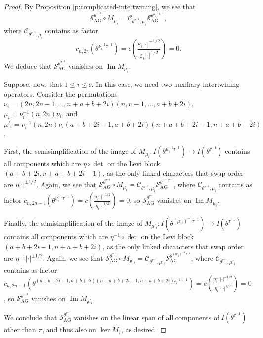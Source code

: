 \documentclass{amsart}
\theoremstyle{definition}
\renewcommand{\Im}{\operatorname{Im}}
\newcommand{\AG}{\operatorname{AG}}
\begin{document}
{\begin{proof}
By Proposition \ref{p:complicated-intertwining}, we see that
\[\mathcal{S}_{\AG}^{\theta^{\tau^{-1}}}\circ
M_{\mu_i}=\mathcal{C}_{\theta^{\tau^{-1}},\mu_i}\mathcal{S}_{\AG}^{\theta^{\mu_i^{-1}\tau^{-1}}},\]
where
$\mathcal{C}_{\theta^{\tau^{-1}},\mu_i}$ contains as factor
\[c_{n,2n}(\theta^{\nu_i^{-1}\tau^{-1}})=c\left(\frac{\varepsilon_i|\cdot|^{-1/2}}{\varepsilon_i|\cdot|^{1/2}}\right)=0.\]
We deduce that $\mathcal{S}_{\AG}^{\theta^{\tau^{-1}}}$ vanishes on $\Im M_{\mu_i}$.

Suppose, now, that $1\leqslant i\leqslant c$. In this case, we need two
auxiliary intertwining operators. Consider the permutations
$\nu_i=(2n,2n-1,\ldots, n+a+b+2i)(n,n-1,\ldots,a+b+2i)$,
$\mu_i=\nu_i^{-1}(n,2n)\nu_i$, and
$\mu'_i=\nu_i^{-1}(n,2n)\nu_i(a+b+2i-1,a+b+2i)(n+a+b+2i-1,n+a+b+2i)$.

First, the semisimplification of the image of
$M_{\mu_i}: I(\theta^{\mu_i^{-1}\tau^{-1}})\to
I(\theta^{\tau^{-1}})$ contains all components which are
$\eta\circ\det$ on the Levi block $(a+b+2i,n+a+b+2i-1)$, as the
only linked characters that swap order are $\eta|\cdot|^{\pm
  1/2}$. Again, we see that
$\mathcal{S}_{\AG}^{\theta^{\tau^{-1}}}\circ
M_{\mu_i}=\mathcal{C}_{\theta^{\tau^{-1}},\mu_i}\mathcal{S}_{\AG}^{\theta^{\mu_i^{-1}\tau^{-1}}}$,
where $\mathcal{C}_{\theta^{\tau^{-1}},\mu_i}$ contains as factor
$c_{n,2n-1}(\theta^{\nu_i^{-1}\tau^{-1}})=c\left(\frac{\eta_i|\cdot|^{-1/2}}{\eta_i|\cdot|^{1/2}}\right)=0$,
so $\mathcal{S}_{\AG}^{\theta^{\tau^{-1}}}$ vanishes on $\Im M_{\mu_i}$.

Finally, the semisimplification of the image of
$M_{\mu'_i}: I(\theta^{(\mu'_i)^{-1}\tau^{-1}})\to
I(\theta^{\tau^{-1}})$ contains all components which are
$\eta^{-1}\circ\det$ on the Levi block $(a+b+2i-1,n+a+b+2i)$, as the
only linked characters that swap order are $\eta^{-1}|\cdot|^{\pm
  1/2}$. Again, we see that
$\mathcal{S}_{\AG}^{\theta^{\tau^{-1}}}\circ
M_{\mu'_i}=\mathcal{C}_{\theta^{\tau^{-1}},\mu'_i}\mathcal{S}_{\AG}^{\theta^{(\mu'_i)^{-1}\tau^{-1}}}$,
where
$\mathcal{C}_{\theta^{\tau^{-1}},\mu'_i}$ contains as factor
$c_{n,2n-1}(\theta^{(a+b+2i-1,a+b+2i)(n+a+b+2i-1,n+a+b+2i)\nu_i^{-1}\tau^{-1}})=c(\frac{\eta_i^{-1}|\cdot|^{-1/2}}{\eta_i^{-1}|\cdot|^{1/2}})=0$,
so $\mathcal{S}_{\AG}^{\theta^{\tau^{-1}}}$ vanishes on $\Im
M_{\mu'_i}$.

We conclude that $\mathcal{S}_{\AG}^{\theta^{\tau^{-1}}}$ vanishes on the linear span of all components of $I(\theta^{\tau^{-1}})$ other than $\pi$, and thus also on $\ker M_\tau$, as desired.
\end{proof}

}
\end{document}
